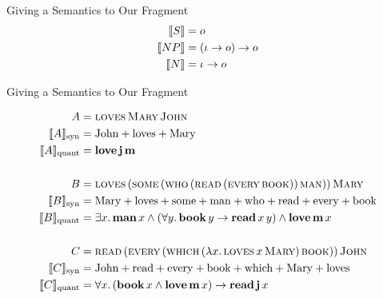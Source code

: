 \documentclass{beamer}
\begin{document}
\begin{frame}{Giving a Semantics to Our Fragment}
{\begin{align*}
    \llbracket S \rrbracket &= o \\
    \llbracket NP \rrbracket &= (\iota \to o) \to o \\
    \llbracket N \rrbracket &= \iota \to o
  \end{align*}
  }
\end{frame}


\begin{frame}{Giving a Semantics to Our Fragment}
  
  \begin{align*}
  A &= \textsc{loves}\,\textsc{Mary}\,\textsc{John} \\
  \llbracket A \rrbracket_{\mathrm{syn}} &= \mathrm{John} + \mathrm{loves} + \mathrm{Mary} \\
  \llbracket A \rrbracket_{\mathrm{quant}} &= \textbf{love}\,\textbf{j}\,\textbf{m} \\
  \\
  B &= \textsc{loves}\,(\textsc{some}\,(\textsc{who}\,(\textsc{read}\,(\textsc{every}\,\textsc{book}))\,\textsc{man}))\,\textsc{Mary} \\
  \llbracket B \rrbracket_{\mathrm{syn}} &= \mathrm{Mary} + \mathrm{loves} + \mathrm{some} + \mathrm{man} + \mathrm{who} + \mathrm{read} + \mathrm{every} + \mathrm{book} \\
  \llbracket B \rrbracket_{\mathrm{quant}} &= \exists x.\, \textbf{man}\,x \land (\forall y.\, \textbf{book}\,y \to \textbf{read}\,x\,y) \land \textbf{love}\,\textbf{m}\,x \\
  \\
  C &= \textsc{read}\,(\textsc{every}\,(\textsc{which}\,(\lambda x.\, \textsc{loves}\,x\,\textsc{Mary})\,\textsc{book}))\,\textsc{John} \\
  \llbracket C \rrbracket_{\mathrm{syn}} &= \mathrm{John} + \mathrm{read} + \mathrm{every} + \mathrm{book} + \mathrm{which} + \mathrm{Mary} + \mathrm{loves} \\
  \llbracket C \rrbracket_{\mathrm{quant}} &= \forall x.\, (\textbf{book}\,x \land \textbf{love}\,\textbf{m}\,x) \to \textbf{read}\,\textbf{j}\,x
  \end{align*}

\end{frame}
\end{document}
